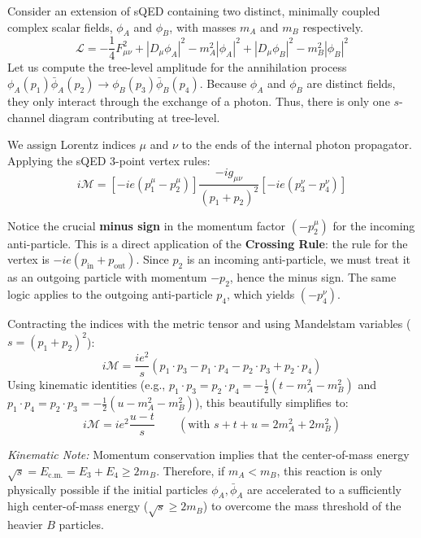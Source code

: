 \begin{example}
    Consider an extension of sQED containing two distinct, minimally coupled complex scalar fields, $\phi_A$ and $\phi_B$, with masses $m_A$ and $m_B$ respectively.
    \[
        \mathcal{L} = -\frac{1}{4}F_{\mu\nu}^2 + |D_\mu \phi_A|^2 - m_A^2|\phi_A|^2 + |D_\mu \phi_B|^2 - m_B^2|\phi_B|^2
    \]
    Let us compute the tree-level amplitude for the annihilation process $\phi_A(p_1) \bar{\phi}_A(p_2) \to \phi_B(p_3) \bar{\phi}_B(p_4)$.
    Because $\phi_A$ and $\phi_B$ are distinct fields, they only interact through the exchange of a photon. Thus, there is only one $s$-channel diagram contributing at tree-level.

    We assign Lorentz indices $\mu$ and $\nu$ to the ends of the internal photon propagator. Applying the sQED 3-point vertex rules:
    \[
        i\mathcal{M} = \left[ -ie(p_1^\mu - p_2^\mu) \right] \frac{-i g_{\mu\nu}}{(p_1 + p_2)^2} \left[ -ie(p_3^\nu - p_4^\nu) \right]
    \]
    \begin{remark}
        Notice the crucial \textbf{minus sign} in the momentum factor $(-p_2^\mu)$ for the incoming anti-particle. This is a direct application of the \textbf{Crossing Rule}: the rule for the vertex is $-ie(p_{\text{in}} + p_{\text{out}})$. Since $p_2$ is an incoming anti-particle, we must treat it as an outgoing particle with momentum $-p_2$, hence the minus sign. The same logic applies to the outgoing anti-particle $p_4$, which yields $(-p_4^\nu)$.
    \end{remark}

    Contracting the indices with the metric tensor and using Mandelstam variables ($s = (p_1+p_2)^2$):
    \[
        i\mathcal{M} = \frac{ie^2}{s} (p_1 \cdot p_3 - p_1 \cdot p_4 - p_2 \cdot p_3 + p_2 \cdot p_4)
    \]
    Using kinematic identities (e.g., $p_1 \cdot p_3 = p_2 \cdot p_4 = -\frac{1}{2}(t - m_A^2 - m_B^2)$ and $p_1 \cdot p_4 = p_2 \cdot p_3 = -\frac{1}{2}(u - m_A^2 - m_B^2)$), this beautifully simplifies to:
    \[
        i\mathcal{M} = ie^2 \frac{u - t}{s} \qquad (\text{with } s+t+u = 2m_A^2 + 2m_B^2)
    \]

    \textit{Kinematic Note:} Momentum conservation implies that the center-of-mass energy $\sqrt{s} = E_{\text{c.m.}} = E_3 + E_4 \geq 2m_B$. Therefore, if $m_A < m_B$, this reaction is only physically possible if the initial particles $\phi_A, \bar{\phi}_A$ are accelerated to a sufficiently high center-of-mass energy ($\sqrt{s} \geq 2m_B$) to overcome the mass threshold of the heavier $B$ particles.
\end{example}

